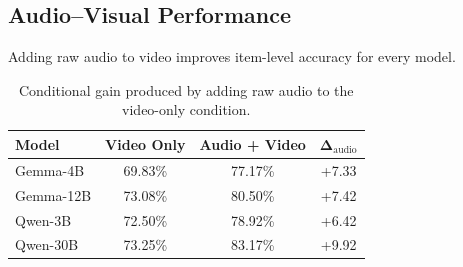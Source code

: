 \subsection*{Audio--Visual Performance}
\label{subsec:audio_video}
Adding raw audio to video improves item-level accuracy for every model.
\begin{table}[h]
    \centering
    \small
    \begin{tabular}{lccc}
        \hline
        \textbf{Model} &
        \textbf{Video Only} &
        \textbf{Audio + Video} &
        $\boldsymbol{\Delta_{\mathrm{audio}}}$ \\
        \hline
        Gemma-4B    & 69.83\% & 77.17\% & +7.33 \\
        Gemma-12B & 73.08\% & 80.50\% & +7.42 \\
        Qwen-3B & 72.50\% & 78.92\% & +6.42 \\
        Qwen-30B & 73.25\% & 83.17\% & +9.92 \\
        \hline
    \end{tabular}
    \caption{Conditional gain produced by adding raw audio to the video-only condition.}
    \label{tab:audio_video_gain}
\end{table}
\begin{table}[h]
    \centering
    \small
    \caption{Exact McNemar comparisons between the video-only condition and the audio-visual condition. Accuracy differences are in percentage points. Confidence intervals were obtained through cluster bootstrap resampling at the pool level, and reported $p$-values are Holm-corrected.}
    \label{tab:mcnemar_video_multimodal}
\end{table}
